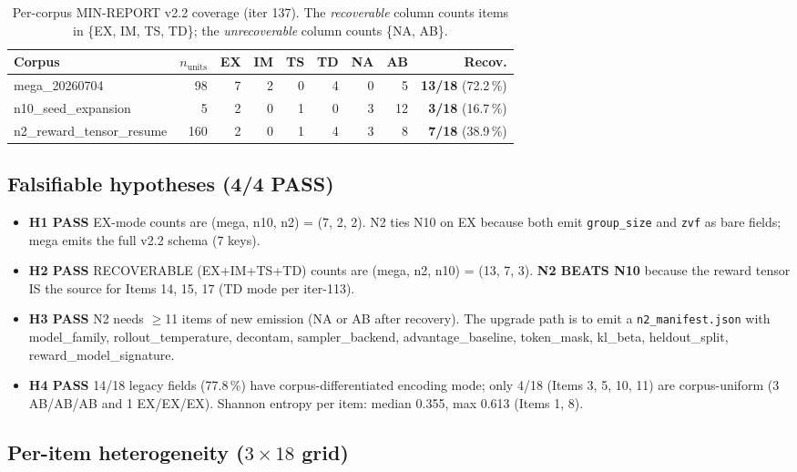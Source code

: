 \begin{table}[t]
\centering
\caption{Per-corpus MIN-REPORT v2.2 coverage (iter 137). The
\emph{recoverable} column counts items in \{EX, IM, TS, TD\}; the
\emph{unrecoverable} column counts \{NA, AB\}.}
\label{tab:p5-iter137-corpus}
\small
\begin{tabular}{@{}lrrrrrrrr@{}}
\toprule
Corpus & $n_{\text{units}}$ & EX & IM & TS & TD & NA & AB & Recov. \\
\midrule
mega\_20260704            &  98 & 7 & 2 & 0 & 4 & 0 & 5 & \textbf{13/18} (72.2\,\%) \\
n10\_seed\_expansion      &   5 & 2 & 0 & 1 & 0 & 3 & 12 & \textbf{3/18} (16.7\,\%) \\
n2\_reward\_tensor\_resume & 160 & 2 & 0 & 1 & 4 & 3 & 8 & \textbf{7/18} (38.9\,\%) \\
\bottomrule
\end{tabular}
\end{table}

\subsection*{Falsifiable hypotheses (4/4 PASS)}

\begin{itemize}
  \item \textbf{H1 PASS} EX-mode counts are (mega, n10, n2) = (7, 2, 2).
    N2 ties N10 on EX because both emit \texttt{group\_size} and \texttt{zvf}
    as bare fields; mega emits the full v2.2 schema (7 keys).
  \item \textbf{H2 PASS} RECOVERABLE (EX+IM+TS+TD) counts are (mega, n2,
    n10) = (13, 7, 3). \textbf{N2 BEATS N10} because the reward tensor IS
    the source for Items 14, 15, 17 (TD mode per iter-113).
  \item \textbf{H3 PASS} N2 needs $\geq$11 items of new emission (NA or AB
    after recovery). The upgrade path is to emit a
    \texttt{n2\_manifest.json} with model\_family, rollout\_temperature,
    decontam, sampler\_backend, advantage\_baseline, token\_mask,
    kl\_beta, heldout\_split, reward\_model\_signature.
  \item \textbf{H4 PASS} 14/18 legacy fields (77.8\,\%) have corpus-differentiated
    encoding mode; only 4/18 (Items 3, 5, 10, 11) are corpus-uniform
    (3 AB/AB/AB and 1 EX/EX/EX). Shannon entropy per item: median 0.355,
    max 0.613 (Items 1, 8).
\end{itemize}

\subsection*{Per-item heterogeneity (\texorpdfstring{$3 \times 18$}{3x18} grid)}


